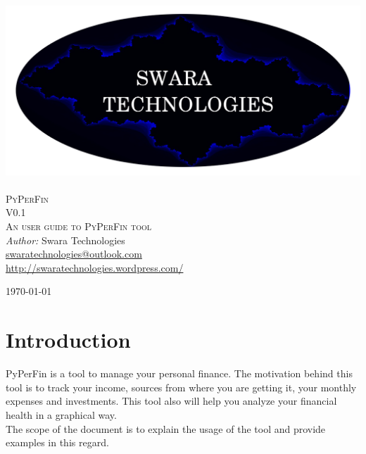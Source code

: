 \documentclass[a4paper,11pt]{book}
\begin{document}
\begin{titlepage}
\begin{center}
\includegraphics[scale=0.75]{../swaratech.jpg}~\\[1cm]


\textsc{\LARGE PyPerFin}\\[1.5cm]
\textsc{\Large V0.1}\\[0.5cm]
\textsc{\Large An user guide to PyPerFin tool}\\[0.5cm]

\emph{Author:}
Swara Technologies\\[10pt]
\href{mailto:swaratechnologies@outlook.com}{swaratechnologies@outlook.com}\\[10pt]
\url{http://swaratechnologies.wordpress.com/}\\[10pt]

\vfill

{\large \today}

\end{center}
\end{titlepage}

\tableofcontents

\chapter{Introduction}

PyPerFin is a tool to manage your personal finance. The motivation behind this tool is to track your income, sources from where you are getting it, your monthly expenses and
investments. This tool also will help you analyze your financial health in a graphical way.\\[10pt]

The scope of the document is to explain the usage of the tool and provide examples in this regard.\\[10pt]
\end{document}
